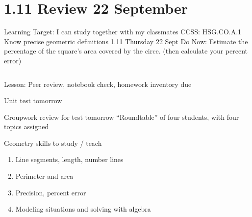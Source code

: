 \documentclass[onlytextwidth]{beamer}
\begin{document}
\section{1.11 Review \hfill 22 September}
\begin{frame}{Learning Target: I can study together with my classmates}
    {CCSS: HSG.CO.A.1 Know precise geometric definitions \hfill \alert{1.11 Thursday 22 Sept}}
        Do Now: Estimate the percentage of the square's area covered by the circe. (then calculate your percent error) \bigskip
        \begin{columns}
        \end{columns} \bigskip
        Lesson: Peer review, notebook check, homework inventory due \par \smallskip
        \alert{Unit test tomorrow}
    \end{frame} 

\begin{frame}{Groupwork review for \alert{test tomorrow}}
    {``Roundtable'' of four students, with four topics assigned}
    \begin{block}{Geometry skills to study / teach}
        \begin{enumerate}
        \item Line segments, length, number lines
        \item Perimeter and area
        \item Precision, percent error
        \item Modeling situations and solving with algebra
    \end{enumerate}
    \end{block}
    \end{frame}
    
\end{document}
